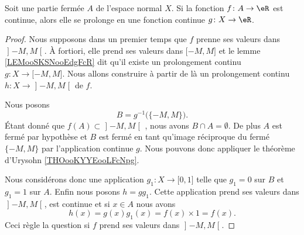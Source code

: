 \begin{theorem}     \label{THOooXKGWooFUYlux}
	Soit une partie fermée \( A\) de l'espace normal \( X\). Si la fonction \( f\colon A\to \eR\) est continue, alors elle se prolonge en une fonction continue \( g\colon X\to \eR\).
\end{theorem}

\begin{proof}
	Nous supposons dans un premier temps que \( f\) prenne ses valeurs dans \( \mathopen] -M , M \mathclose[\). À fortiori, elle prend ses valeurs dans \( \mathopen[ -M , M \mathclose]\) et le lemme \ref{LEMooSKSNooEdgFcR} dit qu'il existe un prolongement continu \( g\colon X\to \mathopen[ -M , M \mathclose]\). Nous allons construire à partir de là un prolongement continu \( h\colon X\to \mathopen] -M , M \mathclose[\) de \( f\).

		Nous posons
		\begin{equation}
			B=g^{-1}\big( \{ -M,M \} \big).
		\end{equation}
		Étant donné que \( f(A)\subset\mathopen] -M , M \mathclose[\) , nous avons \( B\cap A=\emptyset\). De plus \( A\) est fermé par hypothèse et \( B\) est fermé en tant qu'image réciproque du fermé \( \{ -M,M \}\) par l'application continue \( g\). Nous pouvons donc appliquer le théorème d'Urysohn \ref{THOooKYYEooLFcNpg}.

		Nous considérons donc une application \( g_1\colon X\to \mathopen[ 0 , 1 \mathclose]\) telle que \( g_1=0\) sur \( B\) et \( g_1=1\) sur \( A\). Enfin nous posons \( h=gg_1\). Cette application prend ses valeurs dans \( \mathopen] -M , M \mathclose[\), est continue et si \( x\in A\) nous avons
		\begin{equation}
			h(x)=g(x)g_1(x)=f(x)\times 1=f(x).
		\end{equation}
		Ceci règle la question si \( f\) prend ses valeurs dans \( \mathopen] -M , M \mathclose[\).


\end{proof}
